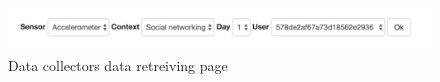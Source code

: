 \begin{figure}[ht!]
\centering
\includegraphics[width=\textwidth,keepaspectratio]{./images/fds_dc_welcome1}
\caption{Data collectors data retreiving page \label{fig:fds5}}
\end{figure}






